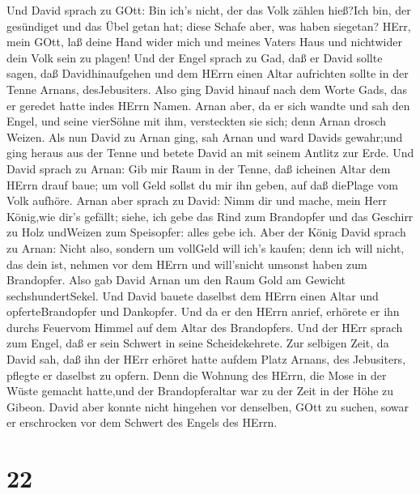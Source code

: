  Und David sprach zu GOtt: Bin ich's nicht, der das Volk
zählen hieß?Ich bin, der gesündiget und das Übel getan hat; diese Schafe
aber, was haben siegetan? HErr, mein GOtt, laß deine Hand wider mich und
meines Vaters Haus und nichtwider dein Volk sein zu plagen!
 Und der Engel sprach zu Gad, daß er David sollte sagen,
daß Davidhinaufgehen und dem HErrn einen Altar aufrichten sollte in der
Tenne Arnans, desJebusiters.  Also ging David hinauf nach
dem Worte Gads, das er geredet hatte indes HErrn Namen. 
Arnan aber, da er sich wandte und sah den Engel, und seine vierSöhne mit
ihm, versteckten sie sich; denn Arnan drosch Weizen.  Als
nun David zu Arnan ging, sah Arnan und ward Davids gewahr;und ging
heraus aus der Tenne und betete David an mit seinem Antlitz zur Erde.
 Und David sprach zu Arnan: Gib mir Raum in der Tenne, daß
icheinen Altar dem HErrn drauf baue; um voll Geld sollst du mir ihn
geben, auf daß diePlage vom Volk aufhöre.  Arnan aber
sprach zu David: Nimm dir und mache, mein Herr König,wie dir's gefällt;
siehe, ich gebe das Rind zum Brandopfer und das Geschirr zu Holz
undWeizen zum Speisopfer: alles gebe ich.  Aber der König
David sprach zu Arnan: Nicht also, sondern um vollGeld will ich's
kaufen; denn ich will nicht, das dein ist, nehmen vor dem HErrn und
will'snicht umsonst haben zum Brandopfer.  Also gab David
Arnan um den Raum Gold am Gewicht sechshundertSekel.  Und
David bauete daselbst dem HErrn einen Altar und opferteBrandopfer und
Dankopfer. Und da er den HErrn anrief, erhörete er ihn durchs Feuervom
Himmel auf dem Altar des Brandopfers.  Und der HErr sprach
zum Engel, daß er sein Schwert in seine Scheidekehrete. 
Zur selbigen Zeit, da David sah, daß ihn der HErr erhöret hatte aufdem
Platz Arnans, des Jebusiters, pflegte er daselbst zu opfern.
 Denn die Wohnung des HErrn, die Mose in der Wüste gemacht
hatte,und der Brandopferaltar war zu der Zeit in der Höhe zu Gibeon.
 David aber konnte nicht hingehen vor denselben, GOtt zu
suchen, sowar er erschrocken vor dem Schwert des Engels des HErrn.

\hypertarget{section-21}{%
\section{22}\label{section-21}}

